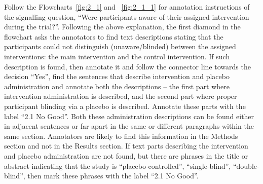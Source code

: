 \documentclass[sn-mathphys,Numbered]{sn-jnl}%
\begin{document}
Follow the Flowcharts~\ref{fig:2_1} and ~\ref{fig:2_1_1} for annotation instructions of the signalling question, ``Were participants aware of their assigned intervention during the trial?''.
Following the above explanation, the first diamond in the flowchart asks the annotators to find text descriptions stating that the participants could not distinguish (unaware/blinded) between the assigned interventions: the main intervention and the control intervention.
If such description is found, then annotate it and follow the connector line towards the decision ``Yes'', find the sentences that describe intervention and placebo administration and annotate both the descriptions – the first part where intervention administration is described, and the second part where proper participant blinding via a placebo is described.
Annotate these parts with the label ``2.1 No Good''.
Both these administration descriptions can be found either in adjacent sentences or far apart in the same or different paragraphs within the same section.
Annotators are likely to find this information in the Methods section and not in the Results section. 
If text parts describing the intervention and placebo administration are not found, but there are phrases in the title or abstract indicating that the study is ``placebo-controlled'', ``single-blind'', ``double-blind'', then mark these phrases with the label ``2.1 No Good''.
\end{document}
